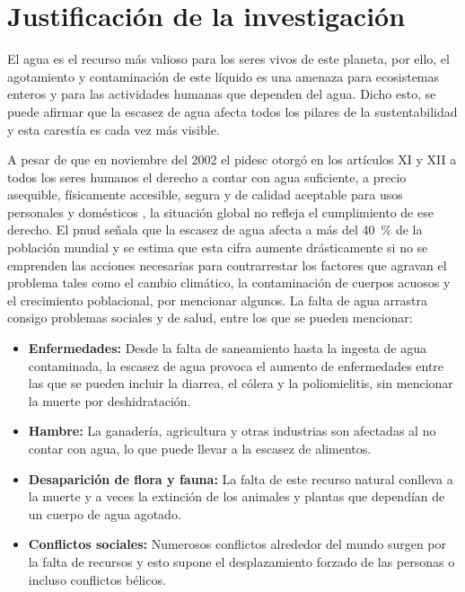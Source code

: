 \chapter{Justificación de la investigación}

	El agua es el recurso más valioso para los seres vivos de este planeta, por ello, el agotamiento y contaminación de este líquido es una amenaza para ecosistemas enteros y para las actividades humanas que dependen del agua. Dicho esto, se puede afirmar que la escasez de agua afecta todos los pilares de la sustentabilidad y esta carestía es cada vez más visible.
	
	A pesar de que en noviembre del 2002 el \acrfull{pidesc} otorgó en los artículos XI y XII a todos los seres humanos el derecho a contar con agua suficiente, a precio asequible, físicamente accesible, segura y de calidad aceptable para usos personales y domésticos \cite{fondo_para_la_comunicacion_y_la_educacion_ambiental_derecho_nodate}, la situación global no refleja el cumplimiento de ese derecho. El \acrfull{pnud} señala que la escasez de agua afecta a más del \qty{40}{\percent} de la población mundial \cite{pnud_objetivo_nodate} y se estima que esta cifra aumente drásticamente si no se emprenden las acciones necesarias para contrarrestar los factores que agravan el problema tales como el cambio climático, la contaminación de cuerpos acuosos y el crecimiento poblacional, por mencionar algunos. La falta de agua arrastra consigo problemas sociales y de salud, entre los que se pueden mencionar:
		
	\begin{itemize}[columns=2]
		\item \textbf{Enfermedades:} Desde la falta de saneamiento hasta la ingesta de agua contaminada, la escasez de agua provoca el aumento de enfermedades entre las que se pueden incluir la diarrea, el cólera y la poliomielitis, sin mencionar la muerte por deshidratación.
		\item \textbf{Hambre:} La ganadería, agricultura y otras industrias son afectadas al no contar con agua, lo que puede llevar a la escasez de alimentos.
		\item \textbf{Desaparición de flora y fauna:} La falta de este recurso natural conlleva a la muerte y a veces la extinción de los animales y plantas que dependían de un cuerpo de agua agotado.
		\item \textbf{Conflictos sociales:} Numerosos conflictos alrededor del mundo surgen por la falta de recursos y esto supone el desplazamiento forzado de las personas o incluso conflictos bélicos.
	\end{itemize}
	
